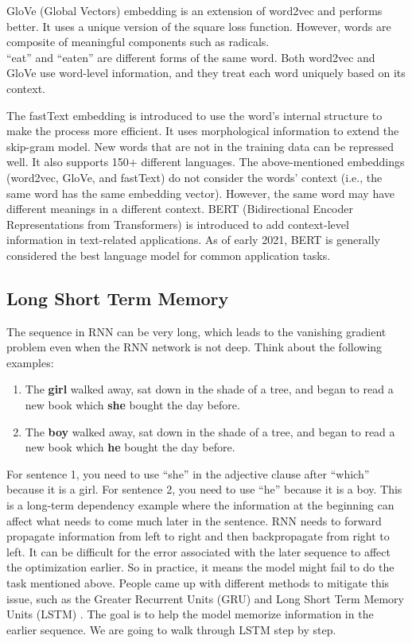 \documentclass[
  12pt,
]{krantz}
\providecommand{\tightlist}{%
  \setlength{\itemsep}{0pt}\setlength{\parskip}{0pt}}
\begin{document}
GloVe (Global Vectors) embedding is an extension of word2vec and performs better. It uses a unique version of the square loss function. However, words are composite of meaningful components such as radicals.\\
``eat'' and ``eaten'' are different forms of the same word. Both word2vec and GloVe use word-level information, and they treat each word uniquely based on its context.

The fastText embedding is introduced to use the word's internal structure to make the process more efficient. It uses morphological information to extend the skip-gram model. New words that are not in the training data can be repressed well. It also supports 150+ different languages. The above-mentioned embeddings (word2vec, GloVe, and fastText) do not consider the words' context (i.e., the same word has the same embedding vector). However, the same word may have different meanings in a different context. BERT (Bidirectional Encoder Representations from Transformers) is introduced to add context-level information in text-related applications. As of early 2021, BERT is generally considered the best language model for common application tasks.

\hypertarget{lstm}{%
\subsection{Long Short Term Memory}\label{lstm}}

The sequence in RNN can be very long, which leads to the vanishing gradient problem even when the RNN network is not deep. Think about the following examples:

\begin{enumerate}
\def\labelenumi{\arabic{enumi}.}
\tightlist
\item
  The \textbf{girl} walked away, sat down in the shade of a tree, and began to read a new book which \textbf{she} bought the day before.
\item
  The \textbf{boy} walked away, sat down in the shade of a tree, and began to read a new book which \textbf{he} bought the day before.
\end{enumerate}

For sentence 1, you need to use ``she'' in the adjective clause after ``which'' because it is a girl. For sentence 2, you need to use ``he'' because it is a boy. This is a long-term dependency example where the information at the beginning can affect what needs to come much later in the sentence. RNN needs to forward propagate information from left to right and then backpropagate from right to left. It can be difficult for the error associated with the later sequence to affect the optimization earlier. So in practice, it means the model might fail to do the task mentioned above. People came up with different methods to mitigate this issue, such as the Greater Recurrent Units (GRU) \citep{chung2014empirical} and Long Short Term Memory Units (LSTM) \citep{lstm1997}. The goal is to help the model memorize information in the earlier sequence. We are going to walk through LSTM step by step.
\end{document}
